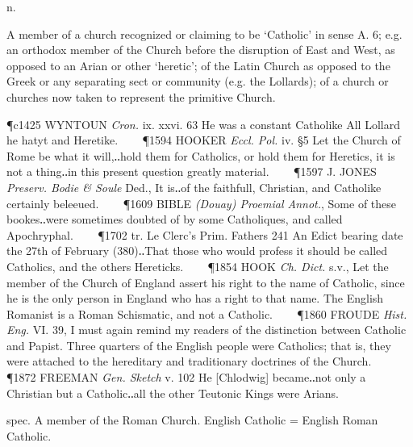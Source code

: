 \begin{description}[wide, labelwidth=!, labelindent=0pt]
\begin{myenumerate}
 n.

 A member of a church recognized or claiming to be ‘Catholic’ in sense A. 6; e.g. an orthodox member of the Church before the disruption of East and West, as opposed to an Arian or other ‘heretic’; of the Latin Church as opposed to the Greek or any separating sect or community (e.g. the Lollards); of a church or churches now taken to represent the primitive Church.

\P c1425 WYNTOUN  \textit{Cron.} ix. xxvi. 63 He was a constant Catholike All Lollard he hatyt and Heretike.    
\P 1594 HOOKER  \textit{Eccl. Pol.} iv. §5 Let the Church of Rome be what it will,‥hold them for Catholics, or hold them for Heretics, it is not a thing‥in this present question greatly material.    
\P 1597 J. JONES  \textit{Preserv. Bodie \& Soule} Ded., It is‥of the faithfull, Christian, and Catholike certainly beleeued.    
\P 1609 BIBLE  \textit{(Douay) Proemial Annot.}, Some of these bookes‥were sometimes doubted of by some Catholiques, and called Apochryphal.    
\P 1702 tr. Le Clerc's Prim. Fathers 241 An Edict bearing date the 27th of February (380)‥That those who would profess it should be called Catholics, and the others Hereticks.    
\P 1854 HOOK  \textit{Ch. Dict.} s.v., Let the member of the Church of England assert his right to the name of Catholic, since he is the only person in England who has a right to that name. The English Romanist is a Roman Schismatic, and not a Catholic.    
\P 1860 FROUDE  \textit{Hist. Eng.} VI. 39, I must again remind my readers of the distinction between Catholic and Papist. Three quarters of the English people were Catholics; that is, they were attached to the hereditary and traditionary doctrines of the Church.    
\P 1872 FREEMAN  \textit{Gen. Sketch} v. 102 He [Chlodwig] became‥not only a Christian but a Catholic‥all the other Teutonic Kings were Arians.

 spec. A member of the Roman Church. English Catholic = English Roman Catholic.


\end{myenumerate}
\end{description}
